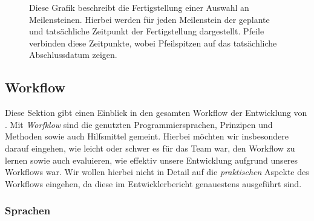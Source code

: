 \begin{figure}
  \centering
  \caption{Diese Grafik beschreibt die Fertigstellung einer Auswahl an Meilensteinen. Hierbei werden für jeden Meilenstein der geplante und tatsächliche Zeitpunkt der Fertigstellung dargestellt. Pfeile verbinden diese Zeitpunkte, wobei Pfeilspitzen auf das tatsächliche Abschlussdatum zeigen.}
  \label{fig:time-frame}
\end{figure}

\subsection{Workflow}
\label{team:orga-workflow}

Diese Sektion gibt einen Einblick in den gesamten Workflow der Entwicklung von
\erasim{}. Mit \emph{Worfklow} sind die genutzten Programmiersprachen, Prinzipen und Methoden sowie auch Hilfsmittel gemeint. Hierbei möchten wir insbesondere darauf eingehen, wie leicht oder schwer es für das Team war, den Workflow zu lernen sowie auch evaluieren, wie effektiv unsere Entwicklung aufgrund unseres Workflows war. Wir wollen hierbei nicht in Detail auf die \emph{praktischen} Aspekte des Workflows eingehen, da diese im Entwicklerbericht genauestens ausgeführt sind.

\subsubsection{Sprachen}
\label{team:orga-workflow-lang}

